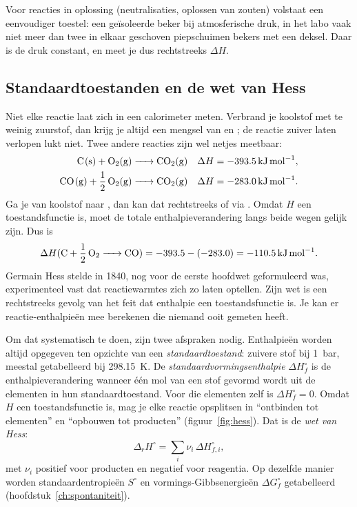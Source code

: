 Voor reacties in oplossing (neutralisaties, oplossen van zouten) volstaat een eenvoudiger toestel: een ge\"isoleerde beker bij atmosferische druk, in het labo vaak niet meer dan twee in elkaar geschoven piepschuimen bekers met een deksel. Daar is de druk constant, en meet je dus rechtstreeks $\Delta H$.

\subsection{Standaardtoestanden en de wet van Hess}

Niet elke reactie laat zich in een calorimeter meten. Verbrand je koolstof met te weinig zuurstof, dan krijg je altijd een mengsel van  en ; de reactie  zuiver laten verlopen lukt niet. Twee andere reacties zijn wel netjes meetbaar:
\begin{align*}
\ce{C(s) + O2(g) &-> CO2(g)} & \Delta H &= \SI{-393.5}{\kilo\joule\per\mole},\\
\ce{CO(g) + 1/2 O2(g) &-> CO2(g)} & \Delta H &= \SI{-283.0}{\kilo\joule\per\mole}.
\end{align*}
Ga je van koolstof naar , dan kan dat rechtstreeks of via . Omdat $H$ een toestandsfunctie is, moet de totale enthalpieverandering langs beide wegen gelijk zijn. Dus is
\[
\Delta H(\ce{C + 1/2 O2 -> CO}) = -393.5 - (-283.0) = \SI{-110.5}{\kilo\joule\per\mole}.
\]
Germain Hess stelde in 1840, nog voor de eerste hoofdwet geformuleerd was, experimenteel vast dat reactiewarmtes zich zo laten optellen. Zijn wet is een rechtstreeks gevolg van het feit dat enthalpie een toestandsfunctie is. Je kan er reactie-enthalpie\"en mee berekenen die niemand ooit gemeten heeft.

Om dat systematisch te doen, zijn twee afspraken nodig. Enthalpie\"en worden altijd opgegeven ten opzichte van een \emph{standaardtoestand}: zuivere stof bij \SI{1}{\bar}, meestal getabelleerd bij \SI{298.15}{\kelvin}. De \emph{standaardvormingsenthalpie} $\Delta H_f^\circ$ is de enthalpieverandering wanneer \'e\'en mol van een stof gevormd wordt uit de elementen in hun standaardtoestand. Voor die elementen zelf is $\Delta H_f^\circ = 0$. Omdat $H$ een toestandsfunctie is, mag je elke reactie opsplitsen in ``ontbinden tot elementen'' en ``opbouwen tot producten'' (figuur~\ref{fig:hess}). Dat is de \emph{wet van Hess}:
\begin{equation}
\Delta_r H^\circ = \sum_i \nu_i\, \Delta H_{f,i}^\circ ,
\end{equation}
met $\nu_i$ positief voor producten en negatief voor reagentia. Op dezelfde manier worden standaardentropie\"en $S^\circ$ en vormings-Gibbsenergie\"en $\Delta G_f^\circ$ getabelleerd (hoofdstuk~\ref{ch:spontaniteit}).

